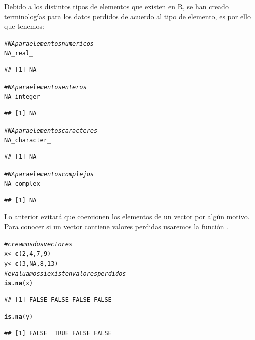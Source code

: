 \documentclass[11pt,a4paper,oneside]{book}\usepackage[]{graphicx}\usepackage[]{color}
\makeatletter
\newcommand{\hlnum}[1]{\textcolor[rgb]{0.686,0.059,0.569}{#1}}%
\newcommand{\hlcom}[1]{\textcolor[rgb]{0.678,0.584,0.686}{\textit{#1}}}%
\newcommand{\hlstd}[1]{\textcolor[rgb]{0.345,0.345,0.345}{#1}}%
\newcommand{\hlkwb}[1]{\textcolor[rgb]{0.69,0.353,0.396}{#1}}%
\newcommand{\hlkwd}[1]{\textcolor[rgb]{0.737,0.353,0.396}{\textbf{#1}}}%
\newenvironment{kframe}{%
 \def\at@end@of@kframe{}%
 \ifinner\ifhmode%
  \def\at@end@of@kframe{\end{minipage}}%
  \begin{minipage}{\columnwidth}%
 \fi\fi%
 \def\FrameCommand##1{\hskip\@totalleftmargin \hskip-\fboxsep
 \colorbox{shadecolor}{##1}\hskip-\fboxsep
     \hskip-\linewidth \hskip-\@totalleftmargin \hskip\columnwidth}%
 \MakeFramed {\advance\hsize-\width
   \@totalleftmargin\z@ \linewidth\hsize
   \@setminipage}}%
 {\par\unskip\endMakeFramed%
 \at@end@of@kframe}
\newenvironment{knitrout}{}{} %
\newcommand{\code}[1]{\fcolorbox{white}{gray!15}{#1}}
\makeatother
\begin{document}
\begin{itemize}
Debido a los distintos tipos de elementos que existen en R, se han creado terminologías para los datos perdidos de acuerdo al tipo de elemento, es por ello que tenemos: 
\begin{knitrout}
\color{fgcolor}\begin{kframe}
\begin{alltt}
\hlcom{#NA para elementos numericos}
\hlnum{NA_real_}
\end{alltt}
\begin{verbatim}
## [1] NA
\end{verbatim}
\begin{alltt}
\hlcom{#NA para elementos enteros}
\hlnum{NA_integer_}
\end{alltt}
\begin{verbatim}
## [1] NA
\end{verbatim}
\begin{alltt}
\hlcom{#NA para elementos caracteres}
\hlnum{NA_character_}
\end{alltt}
\begin{verbatim}
## [1] NA
\end{verbatim}
\begin{alltt}
\hlcom{#NA para elementos complejos}
\hlnum{NA_complex_}
\end{alltt}
\begin{verbatim}
## [1] NA
\end{verbatim}
\end{kframe}
\end{knitrout}

Lo anterior evitará que coercionen los elementos de un vector por algún motivo. Para conocer si un vector contiene valores perdidas usaremos la función \code{\texttt{is.na( )}}.
\begin{knitrout}
\color{fgcolor}\begin{kframe}
\begin{alltt}
\hlcom{# creamos dos vectores}
\hlstd{x} \hlkwb{<-} \hlkwd{c}\hlstd{(}\hlnum{2}\hlstd{,} \hlnum{4}\hlstd{,} \hlnum{7}\hlstd{,} \hlnum{9}\hlstd{)}
\hlstd{y} \hlkwb{<-} \hlkwd{c}\hlstd{(}\hlnum{3}\hlstd{,} \hlnum{NA}\hlstd{,} \hlnum{8}\hlstd{,} \hlnum{13}\hlstd{)}
\hlcom{# evaluamos si existen valores perdidos}
\hlkwd{is.na}\hlstd{(x)}
\end{alltt}
\begin{verbatim}
## [1] FALSE FALSE FALSE FALSE
\end{verbatim}
\begin{alltt}
\hlkwd{is.na}\hlstd{(y)}
\end{alltt}
\begin{verbatim}
## [1] FALSE  TRUE FALSE FALSE
\end{verbatim}
\end{kframe}
\end{knitrout}


\end{itemize}
\end{document}
